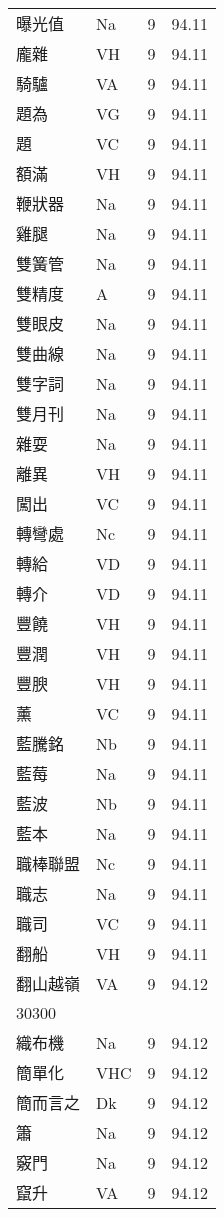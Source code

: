 \documentclass[twocolumn]{book}
\begin{document}
\begin{supertabular}{llrr}
曝光值 & Na & 9 &  94.11\\
龐雜 & VH & 9 &  94.11\\
騎驢 & VA & 9 &  94.11\\
題為 & VG & 9 &  94.11\\
題 & VC & 9 &  94.11\\
額滿 & VH & 9 &  94.11\\
鞭狀器 & Na & 9 &  94.11\\
雞腿 & Na & 9 &  94.11\\
雙簧管 & Na & 9 &  94.11\\
雙精度 & A & 9 &  94.11\\
雙眼皮 & Na & 9 &  94.11\\
雙曲線 & Na & 9 &  94.11\\
雙字詞 & Na & 9 &  94.11\\
雙月刊 & Na & 9 &  94.11\\
雜耍 & Na & 9 &  94.11\\
離異 & VH & 9 &  94.11\\
闖出 & VC & 9 &  94.11\\
轉彎處 & Nc & 9 &  94.11\\
轉給 & VD & 9 &  94.11\\
轉介 & VD & 9 &  94.11\\
豐饒 & VH & 9 &  94.11\\
豐潤 & VH & 9 &  94.11\\
豐腴 & VH & 9 &  94.11\\
薰 & VC & 9 &  94.11\\
藍騰銘 & Nb & 9 &  94.11\\
藍莓 & Na & 9 &  94.11\\
藍波 & Nb & 9 &  94.11\\
藍本 & Na & 9 &  94.11\\
職棒聯盟 & Nc & 9 &  94.11\\
職志 & Na & 9 &  94.11\\
職司 & VC & 9 &  94.11\\
翻船 & VH & 9 &  94.11\\
翻山越嶺 & VA & 9 &  94.12\\
30300\\
織布機 & Na & 9 &  94.12\\
簡單化 & VHC & 9 &  94.12\\
簡而言之 & Dk & 9 &  94.12\\
簫 & Na & 9 &  94.12\\
竅門 & Na & 9 &  94.12\\
竄升 & VA & 9 &  94.12\\

\end{supertabular}
\end{document}
